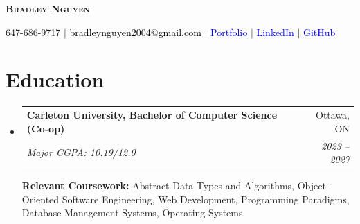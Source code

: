 \documentclass[letterpaper,11pt]{article}
\makeatletter
\newcommand{\resumeSubheading}[4]{
  \vspace{-2pt}\item
    \begin{tabular*}{0.97\textwidth}[t]{l@{\extracolsep{\fill}}r}
      \textbf{#1} & #2 \\
      \textit{\small#3} & \textit{\small #4} \\
    \end{tabular*}\vspace{-7pt}
}
\newcommand{\resumeSubHeadingListStart}{\begin{itemize}[leftmargin=0.15in, label={}]}
\newcommand{\resumeSubHeadingListEnd}{\end{itemize}}
\makeatother
\begin{document}
\begin{center}
    \textbf{\Huge \scshape Bradley Nguyen} \\ \vspace{1pt}

    \small 647-686-9717 $|$ 
    \href{mailto:bradleynguyen2004@gmail.com}{\textcolor{black}{bradleynguyen2004@gmail.com}} $|$ 
    \href{https://www.bradleynguyen.co}{\textcolor{blue}{Portfolio}} $|$ 
    \href{https://www.linkedin.com/in/bradley-nguyen-cs}{\textcolor{blue}{LinkedIn}} $|$
    \href{https://www.github.com/bradleyngu}{\textcolor{blue}{GitHub}}
\end{center}


\section{Education}
  \resumeSubHeadingListStart
    \resumeSubheading
      {Carleton University, Bachelor of Computer Science (Co-op)}{Ottawa, ON}
      {Major CGPA: 10.19/12.0}{2023 -- 2027}
      \vspace{0.2em} 
      
      {\textbf{Relevant Coursework:} Abstract Data Types and Algorithms, Object-Oriented Software Engineering, Web Development, Programming Paradigms, Database Management Systems, Operating Systems}
  \resumeSubHeadingListEnd



\end{document}
